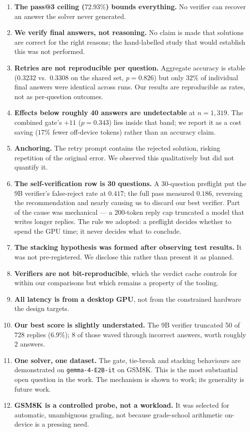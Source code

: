 \documentclass[conference]{IEEEtran}
\begin{document}
\begin{enumerate}
\item \textbf{The pass@3 ceiling ($72.93\%$) bounds everything.} No verifier can recover an
answer the solver never generated.
\item \textbf{We verify final answers, not reasoning.} No claim is made that solutions are
correct for the right reasons; the hand-labelled study that would establish this was not
performed.
\item \textbf{Retries are not reproducible per question.} Aggregate accuracy is stable
($0.3232$ vs.\ $0.3308$ on the shared set, $p=0.826$) but only $32\%$ of individual final
answers were identical across runs. Our results are reproducible as rates, not as
per-question outcomes.
\item \textbf{Effects below roughly 40 answers are undetectable} at $n=1{,}319$. The
combined gate's $+11$ ($p=0.343$) lies inside that band; we report it as a cost saving
($17\%$ fewer off-device tokens) rather than an accuracy claim.
\item \textbf{Anchoring.} The retry prompt contains the rejected solution, risking
repetition of the original error. We observed this qualitatively but did not quantify it.
\item \textbf{The self-verification row is 30 questions.} A 30-question preflight put the
9B verifier's false-reject rate at $0.417$; the full pass measured $0.186$, reversing the
recommendation and nearly causing us to discard our best verifier. Part of the cause was
mechanical --- a 200-token reply cap truncated a model that writes longer replies. The rule
we adopted: a preflight decides whether to spend the GPU time; it never decides what to
conclude.
\item \textbf{The stacking hypothesis was formed after observing test results.} It was not
pre-registered. We disclose this rather than present it as planned.
\item \textbf{Verifiers are not bit-reproducible}, which the verdict cache controls for
within our comparisons but which remains a property of the tooling.
\item \textbf{All latency is from a desktop GPU}, not from the constrained hardware the
design targets.
\item \textbf{Our best score is slightly understated.} The 9B verifier truncated 50 of 728
replies ($6.9\%$); 8 of those waved through incorrect answers, worth roughly 2 answers.
\item \textbf{One solver, one dataset.} The gate, tie-break and stacking behaviours are
demonstrated on \texttt{gemma-4-E2B-it} on GSM8K. This is the most substantial open
question in the work. The mechanism is shown to work; its generality is future work.
\item \textbf{GSM8K is a controlled probe, not a workload.} It was selected for automatic,
unambiguous grading, not because grade-school arithmetic on-device is a pressing need.
\end{enumerate}
\end{document}
